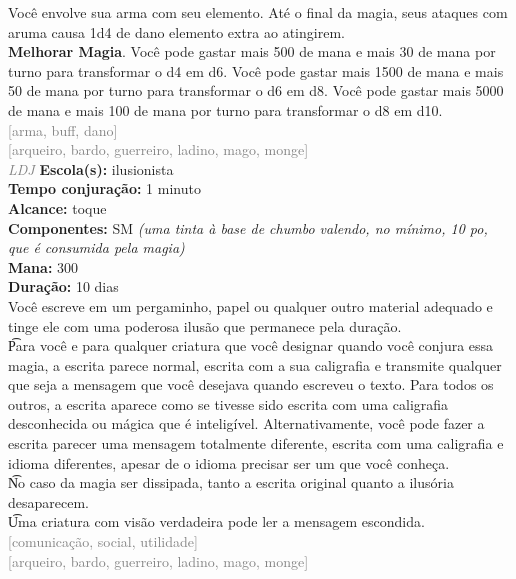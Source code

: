 \documentclass{RPG_Adventure}[2021/10/20]
\begin{document}
{\normalsize Você envolve sua arma com seu elemento. Até o final da magia, seus ataques com aruma causa 1d4 de dano elemento extra ao atingirem.\\\t \textbf{Melhorar Magia}. Você pode gastar mais 500 de mana e mais 30 de mana por turno para transformar o d4 em d6. Você pode gastar mais 1500 de mana e mais 50 de mana por turno para transformar o d6 em d8. Você pode gastar mais 5000 de mana e mais 100 de mana por turno para transformar o d8 em d10.\\}
{\scriptsize \textcolor{gray}{[arma, buff, dano]\\}}
{\scriptsize \textcolor{gray}{[arqueiro, bardo, guerreiro, ladino, mago, monge]\\}}
{\tiny \textcolor{gray}{\textit{LDJ}}}\jump{}
{\small \t \textbf{Escola(s):} ilusionista\\\t \textbf{Tempo conjuração:} 1 minuto\\\t \textbf{Alcance:} toque\\\t \textbf{Componentes:} SM \textit{(uma tinta à base de chumbo valendo, no mínimo, 10 po, que é consumida pela magia)}\\\t \textbf{Mana:} 300\\\t \textbf{Duração:} 10 dias\\}
{\normalsize Você escreve em um pergaminho, papel ou qualquer outro material adequado e tinge ele com uma poderosa ilusão que permanece pela duração.\\\t Para você e para qualquer criatura que você designar quando você conjura essa magia, a escrita parece normal, escrita com a sua caligrafia e transmite qualquer que seja a mensagem que você desejava quando escreveu o texto. Para todos os outros, a escrita aparece como se tivesse sido escrita com uma caligrafia desconhecida ou mágica que é inteligível. Alternativamente, você pode fazer a escrita parecer uma mensagem totalmente diferente, escrita com uma caligrafia e idioma diferentes, apesar de o idioma precisar ser um que você conheça.\\\t No caso da magia ser dissipada, tanto a escrita original quanto a ilusória desaparecem.\\\t Uma criatura com visão verdadeira pode ler a mensagem escondida.\\}
{\scriptsize \textcolor{gray}{[comunicação, social, utilidade]\\}}
{\scriptsize \textcolor{gray}{[arqueiro, bardo, guerreiro, ladino, mago, monge]\\}}
\end{document}
